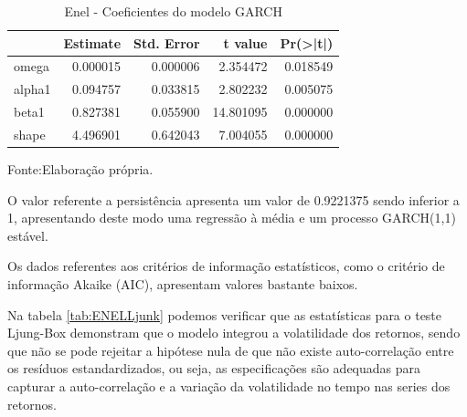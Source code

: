 \documentclass[
  12pt,
  a4paper,
  openany]{book}
\newenvironment{Shaded}{\begin{snugshade}}{\end{snugshade}}
\newcommand{\AttributeTok}[1]{\textcolor[rgb]{0.77,0.63,0.00}{#1}}
\newcommand{\CommentTok}[1]{\textcolor[rgb]{0.56,0.35,0.01}{\textit{#1}}}
\newcommand{\ConstantTok}[1]{\textcolor[rgb]{0.00,0.00,0.00}{#1}}
\newcommand{\DecValTok}[1]{\textcolor[rgb]{0.00,0.00,0.81}{#1}}
\newcommand{\FunctionTok}[1]{\textcolor[rgb]{0.00,0.00,0.00}{#1}}
\newcommand{\NormalTok}[1]{#1}
\newcommand{\OtherTok}[1]{\textcolor[rgb]{0.56,0.35,0.01}{#1}}
\newcommand{\SpecialCharTok}[1]{\textcolor[rgb]{0.00,0.00,0.00}{#1}}
\newcommand{\StringTok}[1]{\textcolor[rgb]{0.31,0.60,0.02}{#1}}
\theoremstyle{definition}
\theoremstyle{definition}
\theoremstyle{definition}
\theoremstyle{remark}
\begin{document}
\scriptsize

\begin{Shaded}
\end{Shaded}

\normalsize

\begin{table}[!h]

\caption{\label{tab:ENELcoef}Enel - Coeficientes do modelo GARCH}
\centering
\begin{tabular}[t]{lrrrr}
\toprule
  &  Estimate &  Std. Error &  t value & Pr(>|t|)\\
\midrule
omega & 0.000015 & 0.000006 & 2.354472 & 0.018549\\
alpha1 & 0.094757 & 0.033815 & 2.802232 & 0.005075\\
beta1 & 0.827381 & 0.055900 & 14.801095 & 0.000000\\
shape & 4.496901 & 0.642043 & 7.004055 & 0.000000\\
\bottomrule
\end{tabular}
\end{table}
\FloatBarrier
\centering

Fonte:Elaboração própria.

\justifying
\bigskip

O valor referente a persistência apresenta um valor de 0.9221375 sendo inferior a 1, apresentando deste modo uma regressão à média e um processo GARCH(1,1) estável.

Os dados referentes aos critérios de informação estatísticos, como o critério de informação Akaike (AIC), apresentam valores bastante baixos.

Na tabela \ref{tab:ENELLjunk} podemos verificar que as estatísticas para o teste Ljung-Box demonstram que o modelo integrou a volatilidade dos retornos, sendo que não se pode rejeitar a hipótese nula de que não existe auto-correlação entre os resíduos estandardizados, ou seja, as especificações são adequadas para capturar a auto-correlação e a variação da volatilidade no tempo nas series dos retornos.
\end{document}
